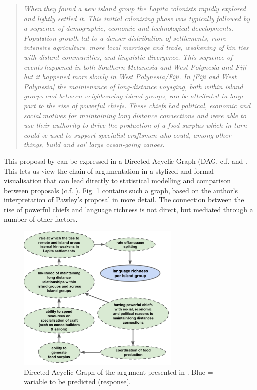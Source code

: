 \documentclass[unnumsec,webpdf,modern,medium]{oup-authoring-template}
\begin{document}
\begin{quotation}
\noindent \emph{When they found a new island group the Lapita colonists rapidly explored and lightly settled it. This initial colonising phase was typically followed by a sequence of demographic, economic and technological developments. Population growth led to a denser distribution of settlements, more intensive agriculture, more local marriage and trade, weakening of kin ties with distant communities, and linguistic divergence. This sequence of events happened in both Southern Melanesia and West Polynesia and Fiji but it happened more slowly in West Polynesia/Fiji. In [Fiji and West Polynesia] the maintenance of long-distance voyaging, both within island groups and between neighbouring island groups, can be attributed in large part to the rise of powerful chiefs. These chiefs had political, economic and social motives for maintaining long distance connections and were able to use their authority to drive the production of a food surplus which in turn could be used to support specialist craftsmen who could, among other things, build and sail large ocean-going canoes.} \citep[28]{pawley2007} \end{quotation}

This proposal by \citet{pawley81, pawley2007} can be expressed in a Directed Acyclic Graph (DAG, c.f. \citet{pearl1995causal} and \citet{mcelreath2020statistical}. This lets us view the chain of argumentation in a stylized and formal visualisation that can lead directly to statistical modelling and comparison between proposals (c.f. \citet{roberts2020chield}). Fig. \ref{Predicting_lgs_DAG_andy} contains such a graph, based on the author's interpretation of Pawley's proposal in more detail. The connection between the rise of powerful chiefs and language richness is not direct, but mediated through a number of other factors. 



\begin{figure}[ht]
\centering
\includegraphics[width=0.7\textwidth]{Predicting_lgs_DAG_andy.png}
\caption{Directed Acyclic Graph of the argument presented in \cite{pawley2007}. Blue = variable to be predicted (response).}
\label{Predicting_lgs_DAG_andy}
\end{figure}
\end{document}
